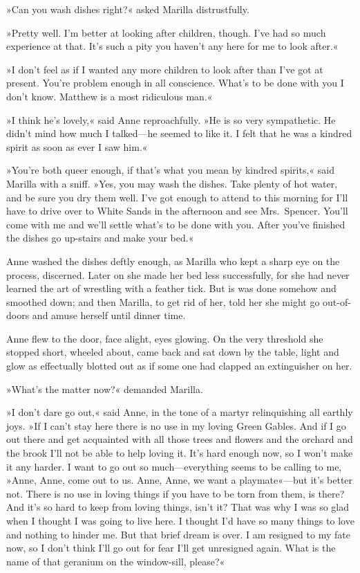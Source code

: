 »Can you wash dishes right?« asked Marilla distrustfully.

»Pretty well. I'm better at looking after children, though. I've had so much experience at that. It's such a pity you haven't any here for me to look after.«

»I don't feel as if I wanted any more children to look after than I've got at present. You're problem enough in all conscience. What's to be done with you I don't know. Matthew is a most ridiculous man.«

»I think he's lovely,« said Anne reproachfully. »He is so very sympathetic. He didn't mind how much I talked—he seemed to like it. I felt that he was a kindred spirit as soon as ever I saw him.«

»You're both queer enough, if that's what you mean by kindred spirits,« said Marilla with a sniff. »Yes, you may wash the dishes. Take plenty of hot water, and be sure you dry them well. I've got enough to attend to this morning for I'll have to drive over to White Sands in the afternoon and see Mrs.~Spencer. You'll come with me and we'll settle what's to be done with you. After you've finished the dishes go up-stairs and make your bed.«

Anne washed the dishes deftly enough, as Marilla who kept a sharp eye on the process, discerned. Later on she made her bed less successfully, for she had never learned the art of wrestling with a feather tick. But is was done somehow and smoothed down; and then Marilla, to get rid of her, told her she might go out-of-doors and amuse herself until dinner time.

Anne flew to the door, face alight, eyes glowing. On the very threshold she stopped short, wheeled about, came back and sat down by the table, light and glow as effectually blotted out as if some one had clapped an extinguisher on her.

»What's the matter now?« demanded Marilla.

»I don't dare go out,« said Anne, in the tone of a martyr relinquishing all earthly joys. »If I can't stay here there is no use in my loving Green Gables. And if I go out there and get acquainted with all those trees and flowers and the orchard and the brook I'll not be able to help loving it. It's hard enough now, so I won't make it any harder. I want to go out so much—everything seems to be calling to me, »Anne, Anne, come out to us. Anne, Anne, we want a playmate«—but it's better not. There is no use in loving things if you have to be torn from them, is there? And it's so hard to keep from loving things, isn't it? That was why I was so glad when I thought I was going to live here. I thought I'd have so many things to love and nothing to hinder me. But that brief dream is over. I am resigned to my fate now, so I don't think I'll go out for fear I'll get unresigned again. What is the name of that geranium on the window-sill, please?«

